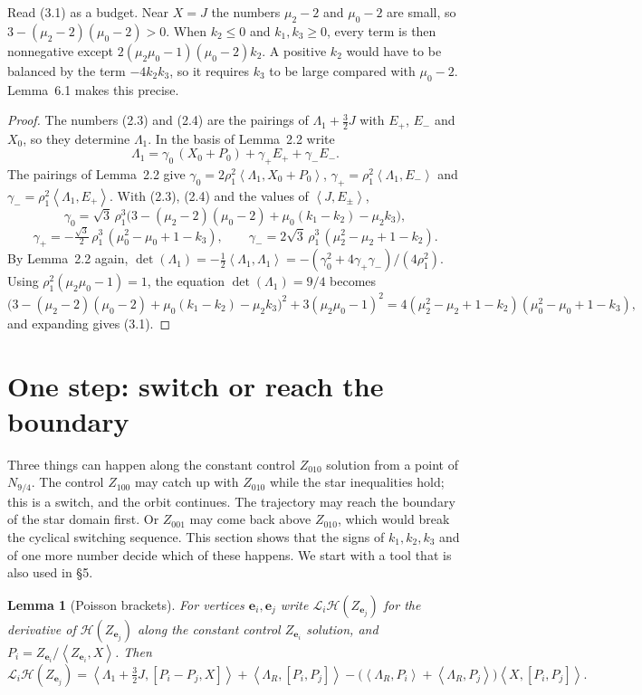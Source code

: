 \documentclass[11pt,a4paper]{article}
\theoremstyle{plain}
\newtheorem{lemma}[theorem]{Lemma}
\theoremstyle{definition}
\theoremstyle{remark}
\newcommand{\bracks}[2]{\left\langle #1,#2\right\rangle}
\renewcommand{\H}{\mathcal{H}}
\newcommand{\ep}{\mathbf{e}}
\begin{document}
Read (3.1) as a budget. Near $X=J$ the numbers $\mu_2-2$ and $\mu_0-2$ are small, so
$3-(\mu_2-2)(\mu_0-2)>0$. When $k_2\le0$ and $k_1,k_3\ge0$, every term is then nonnegative except
$2(\mu_2\mu_0-1)(\mu_0-2)k_2$. A positive $k_2$ would have to be balanced by the term $-4k_2k_3$,
so it requires $k_3$ to be large compared with $\mu_0-2$. Lemma~6.1 makes this precise.

\begin{proof}
The numbers (2.3) and (2.4) are the pairings of $\Lambda_1+\frac32J$ with $E_+$, $E_-$ and $X_0$,
so they determine $\Lambda_1$. In the basis of Lemma~2.2 write
\[
\Lambda_1=\gamma_0\,(X_0+P_0)+\gamma_+E_++\gamma_-E_- .
\]
The pairings of Lemma~2.2 give $\gamma_0=2\rho_1^2\bracks{\Lambda_1}{X_0+P_0}$,
$\gamma_+=\rho_1^2\bracks{\Lambda_1}{E_-}$ and $\gamma_-=\rho_1^2\bracks{\Lambda_1}{E_+}$. With
(2.3), (2.4) and the values of $\bracks J{E_\pm}$,
\[
\gamma_0=\sqrt3\,\rho_1^3\bigl(3-(\mu_2-2)(\mu_0-2)+\mu_0(k_1-k_2)-\mu_2k_3\bigr),
\]
\[
\gamma_+=-\tfrac{\sqrt3}{2}\,\rho_1^3\,(\mu_0^2-\mu_0+1-k_3),\qquad
\gamma_-=2\sqrt3\,\rho_1^3\,(\mu_2^2-\mu_2+1-k_2).
\]
By Lemma~2.2 again,
$\det(\Lambda_1)=-\frac12\bracks{\Lambda_1}{\Lambda_1}=-(\gamma_0^2+4\gamma_+\gamma_-)/(4\rho_1^2)$.
Using $\rho_1^2(\mu_2\mu_0-1)=1$, the equation $\det(\Lambda_1)=9/4$ becomes
\begin{equation}\tag{3.2}
\bigl(3-(\mu_2-2)(\mu_0-2)+\mu_0(k_1-k_2)-\mu_2k_3\bigr)^2+3(\mu_2\mu_0-1)^2
=4(\mu_2^2-\mu_2+1-k_2)(\mu_0^2-\mu_0+1-k_3),
\end{equation}
and expanding gives (3.1).
\end{proof}

\section{One step: switch or reach the boundary}

Three things can happen along the constant control $Z_{010}$ solution from a point of
$N_{9/4}$. The control $Z_{100}$ may catch up with $Z_{010}$ while the star inequalities hold;
this is a switch, and the orbit continues. The trajectory may reach the boundary of the star domain
first. Or $Z_{001}$ may come back above $Z_{010}$, which would break the cyclical switching
sequence. This section shows that the signs of $k_1,k_2,k_3$ and of one more number decide which
of these happens. We start with a tool that is also used in \S5.

\begin{lemma}[Poisson brackets]
For vertices $\ep_i,\ep_j$ write $\mathcal L_i\H(Z_{\ep_j})$ for the derivative of
$\H(Z_{\ep_j})$ along the constant control $Z_{\ep_i}$ solution, and
$P_i=Z_{\ep_i}/\bracks{Z_{\ep_i}}{X}$. Then
\[
\mathcal L_i\H(Z_{\ep_j})=\bracks{\Lambda_1+\tfrac32J}{[P_i-P_j,X]}+\bracks{\Lambda_R}{[P_i,P_j]}
-\bigl(\bracks{\Lambda_R}{P_i}+\bracks{\Lambda_R}{P_j}\bigr)\bracks X{[P_i,P_j]} .
\]
\end{lemma}
\end{document}
